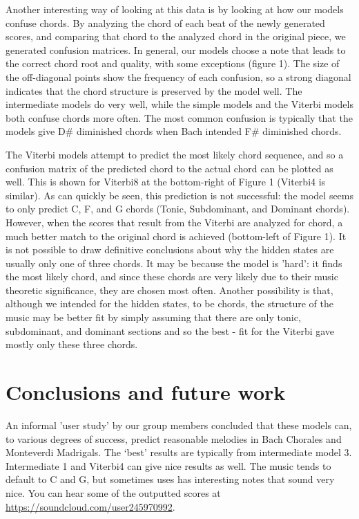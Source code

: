 \documentclass[11pt]{article}
\begin{document}
Another interesting way of looking at this data is by looking at how our models confuse chords. By analyzing the chord of each beat of the newly generated scores, and comparing that chord to the analyzed chord in the original piece, we generated confusion matrices. In general, our models choose a note that leads to the correct chord root and quality, with some exceptions (figure 1). The size of the off-diagonal points show the frequency of each confusion, so a strong diagonal indicates that the chord structure is preserved by the model well. The intermediate models do very well, while the simple models and the Viterbi models both confuse chords more often.  The most common confusion is typically that the models give D\# diminished chords when Bach intended F\# diminished chords. \par
The Viterbi models attempt to predict the most likely chord sequence, and so a confusion matrix of the predicted chord to the actual chord can be plotted as well. This is shown for Viterbi8 at the bottom-right of Figure 1 (Viterbi4 is similar). As can quickly be seen, this prediction is not successful: the model seems to only predict C, F, and G chords (Tonic, Subdominant, and Dominant chords). However, when the scores that result from the Viterbi are analyzed for chord, a much better match to the original chord is achieved (bottom-left of Figure 1). It is not possible to draw definitive conclusions about why the hidden states are usually only one of three chords. It may be because the model is 'hard': it finds the most likely chord, and since these chords are very likely due to their music theoretic significance, they are chosen most often. Another possibility is that, although we intended for the hidden states, to be chords, the structure of the music may be better fit by simply assuming that there are only tonic, subdominant, and dominant sections and so the best - fit for the Viterbi gave mostly only these three chords. \par

\section*{Conclusions and future work}
An informal 'user study' by our group members concluded that these models can, to various degrees of success, predict reasonable melodies in Bach Chorales and Monteverdi Madrigals. The `best' results are typically from intermediate model 3. Intermediate 1 and Viterbi4 can give nice results as well. The music tends to default to C and G, but sometimes uses has interesting notes that sound very nice. You can hear some of the outputted scores at \url{https://soundcloud.com/user245970992}.
\end{document}
